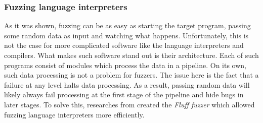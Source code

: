 \subsubsection{Fuzzing language interpreters}
As it was shown, fuzzing can be as easy as starting the target program, passing some random data as input and watching what happens. Unfortunately, this is not the case for more complicated software like the language interpreters and compilers. What makes such software stand out is their architecture. Each of such programs consist of modules which process the data in a pipeline. On its own, such data processing is not a problem for fuzzers. The issue here is the fact that a failure at any level halts data processing. As a result, passing random data will likely always fail processing at the first stage of the pipeline and hide bugs in later stages. To solve this, researches from \cite{dominiak2019efficient} created the \textit{Fluff fuzzer} which allowed fuzzing language interpreters more efficiently.

